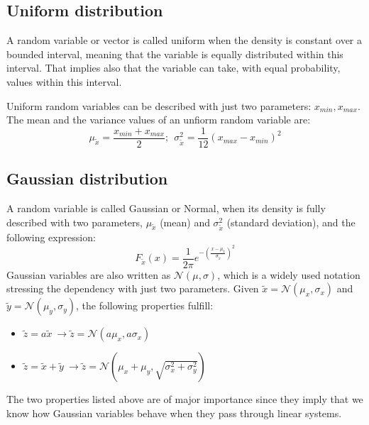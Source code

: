 
\subsection{Uniform distribution}
A random variable or vector is called uniform when the density is constant over a bounded interval, meaning that the variable is equally distributed within this interval. That implies also that the variable can take, with equal probability, values within this interval. 

Uniform random variables can be described with just two parameters: $x_{min}, x_{max}$. The mean and the variance values of an unfiorm random variable are:
\begin{equation}
 \mu_{\tilde{x}} = \frac{x_{min}+x_{max}}{2}; \ \ \sigma^2_{\tilde{x}} = \frac{1}{12}(x_{max}-x_{min})^2
\end{equation}

\subsection{Gaussian distribution}
A random variable is called Gaussian or Normal, when its density is fully described with two parameters, $\mu_{\tilde{x}}$ (mean) and $\sigma^2_{\tilde{x}}$ (standard deviation), and the following expression:
\begin{equation}
 F_{\tilde{x}}(x) = \frac{1}{2\pi}e^{-(\frac{x-\mu_{\tilde{x}}}{\sigma_{\tilde{x}}})^2}
\end{equation}
Gaussian variables are also written as $\mathcal{N}(\mu,\sigma)$, which is a widely used notation stressing the dependency with just two parameters. Given $\tilde{x}=\mathcal{N}(\mu_x,\sigma_x)$ and $\tilde{y}=\mathcal{N}(\mu_y,\sigma_y)$, the following properties fulfill:
\begin{itemize}
 \item $\tilde{z}=a\tilde{x} \ \rightarrow \tilde{z}=\mathcal{N}(a\mu_x,a\sigma_x)$
 \item $\tilde{z}=\tilde{x}+\tilde{y} \ \rightarrow \tilde{z}=\mathcal{N}(\mu_x+\mu_y,\sqrt{\sigma^2_x+\sigma^2_y})$
\end{itemize}
The two properties listed above are of major importance since they imply that we know how Gaussian variables behave when they pass through linear systems. 

